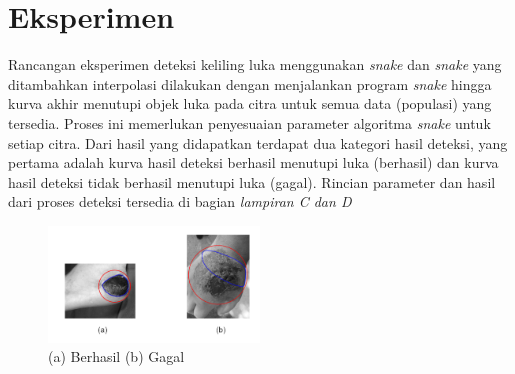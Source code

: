 \section{Eksperimen}
Rancangan eksperimen deteksi keliling luka menggunakan \emph{snake} dan \emph{snake} yang ditambahkan interpolasi dilakukan dengan menjalankan program \emph{snake} hingga kurva akhir menutupi objek luka pada citra untuk semua data (populasi) yang tersedia. Proses ini memerlukan penyesuaian parameter algoritma \emph{snake} untuk setiap citra. Dari hasil yang didapatkan terdapat dua kategori hasil deteksi, yang pertama adalah kurva hasil deteksi berhasil menutupi luka (berhasil) dan kurva hasil deteksi tidak berhasil menutupi luka (gagal). Rincian parameter dan hasil dari proses deteksi tersedia di bagian \emph{lampiran C dan D}
\begin{figure}[H]
	\centering
	\includegraphics[width=0.5\textwidth]{gambar/result_good_bad}
	\caption{(a) Berhasil (b) Gagal}
	\label{Gambar:result_good_bad}
\end{figure}


